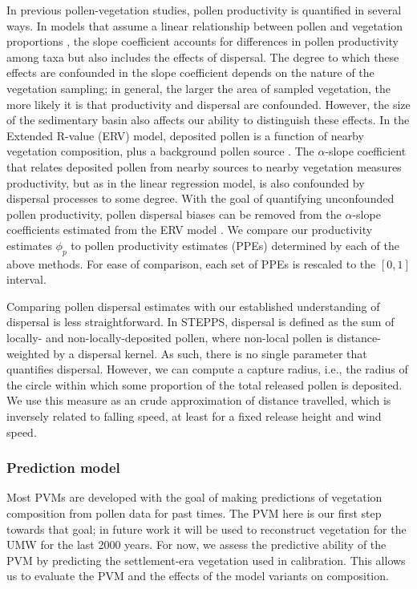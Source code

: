 \documentclass[12pt]{article}
\begin{document}
In previous pollen-vegetation studies, pollen productivity is
quantified in several ways. In models that assume a linear
relationship between pollen and vegetation proportions
\citep{webb1981estimating, bradshaw1985relationships, jackson1990},
the slope coefficient accounts for differences in pollen productivity
among taxa but also includes the effects of dispersal. The degree to
which these effects are confounded in the slope coefficient depends on
the nature of the vegetation sampling; in general, the larger the area
of sampled vegetation, the more likely it is that productivity and
dispersal are confounded. However, the size of the sedimentary basin
also affects our ability to distinguish these effects. In the Extended
R-value (ERV) model, deposited pollen is a function of nearby
vegetation composition, plus a background pollen source
\citep{prentice1986, prentice1987quantitative, marquer2014holocene,
  brostrom2008pollen}. The $\alpha$-slope coefficient that relates
deposited pollen from nearby sources to nearby vegetation measures
productivity, but as in the linear regression model, is also
confounded by dispersal processes to some degree. With the goal of
quantifying unconfounded pollen productivity, pollen dispersal biases
can be removed from the $\alpha$-slope coefficients estimated from the
ERV model \citep{sugita1999landscape}. We compare our productivity
estimates $\phi_p$ to pollen productivity estimates (PPEs) determined
by each of the above methods. For ease of comparison, each set of PPEs
is rescaled to the $[0,1]$ interval.

Comparing pollen dispersal estimates with our established
understanding of dispersal is less straightforward. In STEPPS,
dispersal is defined as the sum of locally- and non-locally-deposited
pollen, where non-local pollen is distance-weighted by a dispersal
kernel. As such, there is no single parameter that quantifies
dispersal. However, we can compute a capture radius, i.e., the radius
of the circle within which some proportion of the total released
pollen is deposited. We use this measure as an crude approximation of
distance travelled, which is inversely related to falling speed, at
least for a fixed release height and wind speed.

\subsubsection{Prediction model}
\label{sec:pred}

Most PVMs are developed with the goal of making predictions of
vegetation composition from pollen data for past times. The PVM here
is our first step towards that goal; in future work it will be used to
reconstruct vegetation for the UMW for the last 2000 years. For now,
we assess the predictive ability of the PVM by predicting the
settlement-era vegetation used in calibration. This allows us to
evaluate the PVM and the effects of the model variants on composition.
\end{document}
